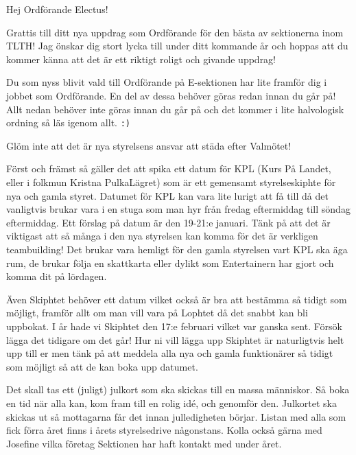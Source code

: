 \documentclass[10pt]{article}
\begin{document}
\heading{\doctitle}

Hej Ordförande Electus!

Grattis till ditt nya uppdrag som Ordförande för den bästa av sektionerna inom TLTH! Jag önskar dig stort lycka till under ditt kommande år och hoppas att du kommer känna att det är ett riktigt roligt och givande uppdrag!

Du som nyss blivit vald till Ordförande på E-sektionen har lite framför dig i jobbet som Ordförande. En del av dessa behöver göras redan innan du går på! Allt nedan behöver inte göras innan du går på och det kommer i lite halvologisk ordning så läs igenom allt. \texttt{:)}

\begin{numplist}
\item Glöm inte att det är nya styrelsens ansvar att städa efter Valmötet!

\item Först och främst så gäller det att spika ett datum för KPL (Kurs På Landet, eller i folkmun Kristna PulkaLägret) som är ett gemensamt styrelseskiphte för nya och gamla styret. Datumet för KPL kan vara lite lurigt att få till då det vanligtvis brukar vara i en stuga som man hyr från fredag eftermiddag till söndag eftermiddag. Ett förslag på datum är den 19-21:e januari. Tänk på att det är viktigast att så många i den nya styrelsen kan komma för det är verkligen teambuilding! Det brukar vara hemligt för den gamla styrelsen vart KPL ska äga rum, de brukar följa en skattkarta eller dylikt som Entertainern har gjort och komma dit på lördagen.

\item Även Skiphtet behöver ett datum vilket också är bra att bestämma så tidigt som möjligt, framför allt om man vill vara på Lophtet då det snabbt kan bli uppbokat. I år hade vi Skiphtet den 17:e februari vilket var ganska sent. Försök lägga det tidigare om det går! Hur ni vill lägga upp Skiphtet är naturligtvis helt upp till er men tänk på att meddela alla nya och gamla funktionärer så tidigt som möjligt så att de kan boka upp datumet.

\item Det skall tas ett (juligt) julkort som ska skickas till en massa människor. Så boka en tid när alla kan, kom fram till en rolig idé, och genomför den. Julkortet ska skickas ut så mottagarna får det innan julledigheten börjar. Listan med alla som fick förra året finns i årets styrelsedrive någonstans. Kolla också gärna med Josefine vilka företag Sektionen har haft kontakt med under året.


\end{numplist}
\end{document}
